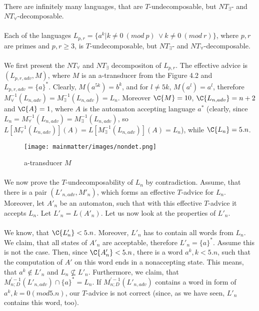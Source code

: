 \paragraph{}
\cveta There are infinitely many languages, that are $T$-undecomposable, but $NT_{\exists}$- and $NT_{\forall}$-decomposable.

\paragraph{}
\dokaz Each of the languages $L_{p,r} = \{a^k|k \neq 0\ (mod\  p)\ \vee k \neq 0\ (mod\  r)\}$, where $p,r$ are primes and $p,r \geq 3$, is $T$-undecomposable, but $NT_{\exists}$- and $NT_{\forall}$-decomposable.

\paragraph{}
We first present the $NT_{\forall}$ and $NT_{\exists}$ decompositon of $L_{p,r}$. The effective advice is $(L_{p,r,adv},M)$, where $M$ is an a-transducer from the Figure 4.2 and $L_{p,r,adv} = \{a\}^*$. Clearly, $M(a^{5k}) = b^k$, and for $l \neq 5k$, $M(a^l) = a^l$, therefore $M^{-1}_{\forall}(L_{n,adv}) = M^{-1}_{\exists}(L_{n,adv}) = L_n$. Moreover $\C{M} = 10$, $\C{L_{n,adv}} = n+2$ and $\C{A} = 1$, where $A$ is the automaton accepting language $a^*$ (clearly, since $L_n = M^{-1}_{\forall}(L_{n,adv}) = M^{-1}_{\exists}(L_{n,adv})$, so $L[M^{-1}_{\forall}(L_{n,adv})](A) = L[M^{-1}_{\exists}(L_{n,adv})](A) = L_n$), while $\C{L_n} = 5.n$. 

\begin{figure}[h!]
\centering
\texttt{[image: mainmatter/images/nondet.png]}
\caption{a-transducer $M$}
\end{figure}

\paragraph{}
We now prove the $T$-undecomposability of $L_n$ by contradiction. Assume, that there is a pair $(L'_{n,adv},M'_n)$, which forms an effective $T$-advice for $L_n$. Moreover, let $A'_n$ be an automaton, such that with this effective $T$-advice it accepts $L_n$. Let $L'_n = L(A'_n)$. Let us now look at the properties of $L'_n$.

\paragraph{}
We know, that $\C{L'_n} < 5.n$. Moreover, $L'_n$ has to contain all words from $L_n$. We claim, that all states of $A'_n$ are acceptable, therefore $L'_n = \{a\}^*$. Assume this is not the case. Then, since $\C{A'_n} < 5.n$, there is a word $a^k, k < 5.n$, such that the computation of $A'$ on this word ends in a nonaccepting state. This means, that $a^k \notin L'_n$ and $L_n \not \subseteq L'_n$. Furthermore, we claim, that $M^{'-1}_{n;D}(L'_{n,adv}) \cap \{a\}^* = L_n$. If $M^{'-1}_{n;D}(L'_{n,adv})$ contains a word in form of $a^k, k = 0 (mod 5.n)$, our $T$-advice is not correct (since, as we have seen, $L'_n$ contains this word, too).

